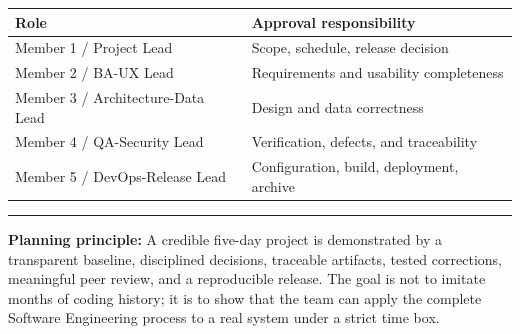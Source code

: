 \documentclass[
  10pt,
  a4paper,
  oneside]{report}
\newcounter{none} %
\begin{document}
{\def\LTcaptype{none} %
\begin{longtable}[]{@{}
  >{\raggedright\arraybackslash}p{}
  >{\raggedright\arraybackslash}p{}@{}}
\toprule\noalign{}
\begin{minipage}[b]{\linewidth}\raggedright
Role
\end{minipage} & \begin{minipage}[b]{\linewidth}\raggedright
Approval responsibility
\end{minipage} \\
\midrule\noalign{}
\endhead
\bottomrule\noalign{}
\endlastfoot
Member 1 / Project Lead & Scope, schedule, release decision \\
Member 2 / BA-UX Lead & Requirements and usability completeness \\
Member 3 / Architecture-Data Lead & Design and data correctness \\
Member 4 / QA-Security Lead & Verification, defects, and traceability \\
Member 5 / DevOps-Release Lead & Configuration, build, deployment,
archive \\
\end{longtable}
}

\begin{center}\rule{0.5\linewidth}{0.5pt}\end{center}

\textbf{Planning principle:} A credible five-day project is demonstrated
by a transparent baseline, disciplined decisions, traceable artifacts,
tested corrections, meaningful peer review, and a reproducible release.
The goal is not to imitate months of coding history; it is to show that
the team can apply the complete Software Engineering process to a real
system under a strict time box.
\end{document}
